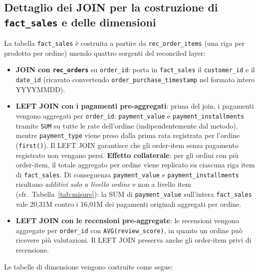 \documentclass[12pt,a4paper]{article}
\begin{document}
\subsection{Dettaglio dei JOIN per la costruzione di \texttt{fact\_sales} e delle dimensioni}
\label{sec:join-fact-sales}

La tabella \texttt{fact\_sales} è costruita a partire da \texttt{rec\_order\_items}
(una riga per prodotto per ordine) unendo quattro sorgenti del reconciled layer:

\begin{itemize}
\sloppy
  \item \textbf{JOIN con \texttt{rec\_orders}} su \texttt{order\_id}: porta in
        \texttt{fact\_sales} il \texttt{customer\_id} e il \texttt{date\_id}
        (ricavato convertendo \texttt{order\_purchase\_timestamp} nel formato
        intero YYYYMMDD).

  \item \textbf{LEFT JOIN con i pagamenti pre-aggregati}: prima del join, i
        pagamenti vengono aggregati per \texttt{order\_id}: \texttt{payment\_value}
        e \texttt{payment\_installments} tramite \texttt{SUM} su tutte le rate
        dell'ordine (indipendentemente dal metodo), mentre \texttt{payment\_type}
        viene preso dalla prima rata registrata per l'ordine (\texttt{first()}).
        Il LEFT JOIN garantisce che gli order-item senza pagamento registrato non
        vengano persi.
        \textbf{Effetto collaterale}: per gli ordini con più order-item, il totale
        aggregato per ordine viene replicato su ciascuna riga item di
        \texttt{fact\_sales}. Di conseguenza \texttt{payment\_value} e
        \texttt{payment\_installments} risultano \textit{additivi solo a livello
        ordine} e non a livello item (cfr.\ Tabella~\ref{tab:misure}): la SUM di
        \texttt{payment\_value} sull'intera \texttt{fact\_sales} vale 20,31M contro
        i 16,01M dei pagamenti originali aggregati per ordine.

  \item \textbf{LEFT JOIN con le recensioni pre-aggregate}: le recensioni vengono
        aggregate per \texttt{order\_id} con \texttt{AVG(review\_score)}, in
        quanto un ordine può ricevere più valutazioni. Il LEFT JOIN preserva anche
        gli order-item privi di recensione.
\end{itemize}

Le tabelle di dimensione vengono costruite come segue:
\end{document}
